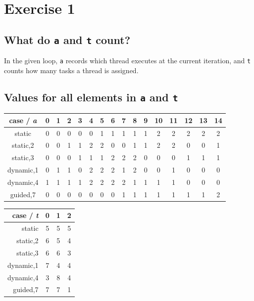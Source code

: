 \documentclass[a4paper,%
11pt,%
DIV12,
headsepline,%
headings=normal,
]{scrartcl}
\begin{document}
\maketitlepage




\section{Exercise 1}

\subsection{What do \texttt{a} and \texttt{t} count?}
In the given loop, \texttt{a} records which thread executes at the current iteration, and \texttt{t} counts how many tasks a thread is assigned.

\subsection{Values for all elements in \texttt{a} and \texttt{t}}

\begin{tabular}{cccccccccccccccc}
	\hline
	case / \textit{a}& 0 & 1 & 2 & 3 & 4 & 5 & 6 & 7 & 8 & 9 & 10 & 11 & 12 & 13 & 14 \\
	\hline
	static& 0 & 0 & 0 & 0 & 0 & 1 & 1 & 1 & 1 & 1 & 2 & 2 & 2 & 2 & 2 \\
	
	static,2& 0 & 0 & 1 & 1 & 2 & 2 & 0 & 0 & 1 & 1 & 2 & 2 & 0 & 0 & 1 \\
	
	static,3& 0 & 0 & 0 & 1 & 1 & 1 & 2 & 2 & 2 & 0 & 0 & 0 & 1 & 1 & 1\\
	
	dynamic,1& 0 & 1 & 1 & 0 & 2 & 2 & 2 & 1 & 2 & 0 & 0 & 1 & 0 & 0 & 0 \\
	
	dynamic,4& 1 & 1 & 1 & 1 & 2 & 2 & 2 & 2 & 1 & 1 & 1 & 1 & 0 & 0 & 0 \\
	
	guided,7& 0 & 0 & 0 & 0 & 0 & 0 & 0 & 1 & 1 & 1 & 1 & 1 & 1 & 1 & 2 \\
	\hline
\end{tabular}


\begin{tabular}{rccc}
	\hline
	case / \textit{t} & 0 & 1 & 2 \\
	\hline
	static & 5 & 5 & 5 \\

	static,2 & 6 & 5 & 4 \\

	static,3 & 6 & 6 & 3 \\

	dynamic,1 & 7 & 4 & 4 \\

	dynamic,4 & 3 & 8 & 4 \\

	guided,7 & 7 & 7 & 1 \\
	\hline
\end{tabular}
\end{document}
